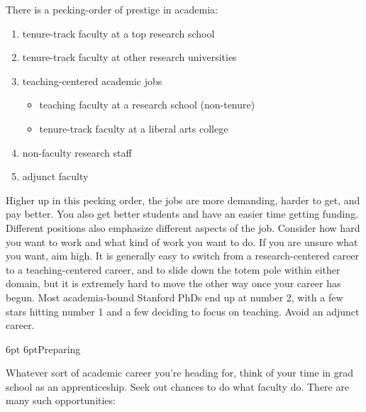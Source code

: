 \documentclass[10pt]{book}
\makeatletter
\def\phd{{\sc PhD}}
\renewcommand{\subsection}{\@startsection{subsection}{2}{0mm}%
   {6pt}%
   {6pt}{\normalfont\normalsize\itshape}}
\makeatother
\begin{document}
There is a pecking-order of prestige in academia:

\begin{enumerate}
\setlength{\itemsep}{1pt}
\setlength{\parskip}{0pt}
\setlength{\parsep}{0pt}
\item tenure-track faculty at a top research school
\item tenure-track faculty at other research universities
\item teaching-centered academic jobs
\begin{itemize}
\item teaching faculty at a research school (non-tenure)
\item tenure-track faculty at a liberal arts college
\end{itemize}
\item non-faculty research staff
\item adjunct faculty
\end{enumerate}

Higher up in this pecking order, the jobs are more demanding, harder to get,
and pay better.  You also get better students and have an easier time getting
funding.  Different positions also emphasize different aspects
of the job.  Consider how hard you want to work and what kind of work you want
to do. If you are unsure what you want, aim high.  It is generally easy
to switch from a research-centered career to a teaching-centered career, and to
slide down the totem pole within either domain, but it is extremely hard to
move the other way once your career has begun.  Most academia-bound Stanford
\phd s end up at number 2, with a few stars hitting number 1 and a few deciding
to focus on teaching.  Avoid an adjunct career.

\subsection{Preparing}

Whatever sort of academic career you're heading for, think of your
time in grad school as an apprenticeship. Seek out chances to do what faculty do.
There are many such opportunities:
\end{document}
